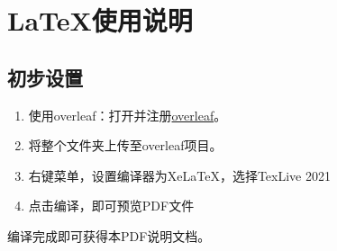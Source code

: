 \chapter{LaTeX使用说明}\label{chap:guide}

\section{初步设置}

\begin{enumerate}
    \item 使用overleaf：打开并注册\href{https://cn.overleaf.com/}{overleaf}。
    \item 将整个文件夹上传至overleaf项目。
    \item 右键菜单，设置编译器为XeLaTeX，选择TexLive 2021
    \item 点击编译，即可预览PDF文件
\end{enumerate}

编译完成即可获得本PDF说明文档。
